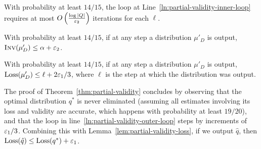 \begin{lemma}
\label{lem:partial-validity-inner-loop}
With probability at least $14/15$, the loop at Line~\ref{ln:partial-validity-inner-loop} requires at most $O\left(\frac{\log |Q|}{\varepsilon_2}\right)$ iterations for each $\ell$.
\end{lemma}

\begin{lemma}
\label{lem:partial-validity-invalid}
With probability at least $14/15$, if at any step a distribution $\mu'_D$ is output, $\textsc{Inv}(\mu'_D) \le \alpha + \varepsilon_2$.
\end{lemma}

\begin{lemma}
\label{lem:partial-validity-loss}
With probability at least $14/15$, if at any step a distribution $\mu'_D$ is output, $\text{Loss}(\mu'_D) \le \ell + 2\varepsilon_1/3$, where $\ell$ is the step at which the distribution was output.
\end{lemma}

The proof of Theorem~\ref{thm:partial-validity} concludes by observing that the optimal distribution $q^*$ is never eliminated (assuming all estimates involving its loss and validity are accurate, which happens with probability at least $19/20$), and that the loop in line~\ref{ln:partial-validity-outer-loop} steps by increments of $\varepsilon_1/3$. 
Combining this with Lemma~\ref{lem:partial-validity-loss}, if we output $\hat q$, then $\text{Loss}(\hat q) \leq \text{Loss}(q^*) + \varepsilon_1$.
